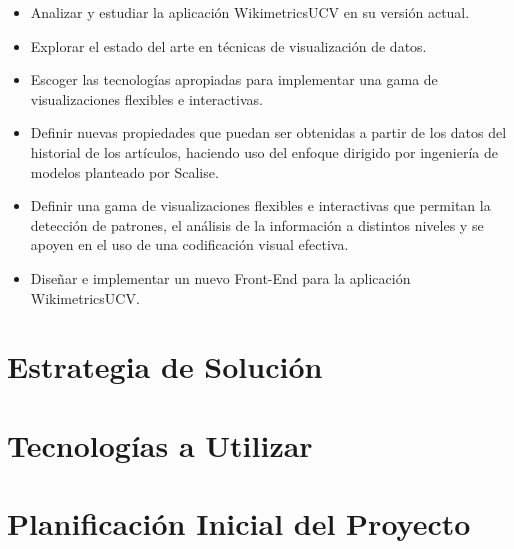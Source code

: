\begin{itemize}
  \item Analizar y estudiar la aplicación WikimetricsUCV en su versión actual.
  \item Explorar el estado del arte en técnicas de visualización de datos.
  \item Escoger las tecnologías apropiadas para implementar una gama de visualizaciones flexibles e interactivas.
  \item Definir nuevas propiedades que puedan ser obtenidas a partir de los datos del historial de los artículos, haciendo uso del enfoque dirigido por ingeniería de modelos planteado por Scalise.
  \item Definir una gama de visualizaciones flexibles e interactivas que permitan la detección de patrones, el análisis de la información a distintos niveles y se apoyen en el uso de una codificación visual efectiva.
  \item Diseñar e implementar un nuevo Front-End para la aplicación WikimetricsUCV.
\end{itemize}

\section{Estrategia de Solución}

\section{Tecnologías a Utilizar}

\section{Planificación Inicial del Proyecto}
